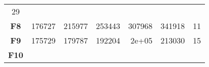 \documentclass[12pt,a4paper]{article}
\begin{document}
\begin{longtable}[c]{@{}crrrrrr@{}}
\begin{minipage}[t]{0.07\columnwidth}
29
\strut\end{minipage}\tabularnewline
\begin{minipage}[t]{0.11\columnwidth}\centering\strut
\textbf{F8}
\strut\end{minipage} &
\begin{minipage}[t]{0.08\columnwidth}\raggedleft\strut
176727
\strut\end{minipage} &
\begin{minipage}[t]{0.08\columnwidth}\raggedleft\strut
215977
\strut\end{minipage} &
\begin{minipage}[t]{0.09\columnwidth}\raggedleft\strut
253443
\strut\end{minipage} &
\begin{minipage}[t]{0.10\columnwidth}\raggedleft\strut
307968
\strut\end{minipage} &
\begin{minipage}[t]{0.11\columnwidth}\raggedleft\strut
341918
\strut\end{minipage} &
\begin{minipage}[t]{0.07\columnwidth}\raggedleft\strut
11
\strut\end{minipage}\tabularnewline
\begin{minipage}[t]{0.11\columnwidth}\centering\strut
\textbf{F9}
\strut\end{minipage} &
\begin{minipage}[t]{0.08\columnwidth}\raggedleft\strut
175729
\strut\end{minipage} &
\begin{minipage}[t]{0.08\columnwidth}\raggedleft\strut
179787
\strut\end{minipage} &
\begin{minipage}[t]{0.09\columnwidth}\raggedleft\strut
192204
\strut\end{minipage} &
\begin{minipage}[t]{0.10\columnwidth}\raggedleft\strut
2e+05
\strut\end{minipage} &
\begin{minipage}[t]{0.11\columnwidth}\raggedleft\strut
213030
\strut\end{minipage} &
\begin{minipage}[t]{0.07\columnwidth}\raggedleft\strut
15
\strut\end{minipage}\tabularnewline
\begin{minipage}[t]{0.11\columnwidth}\centering\strut
\textbf{F10}
\strut\end{minipage} &
\begin{minipage}[t]{0.08\columnwidth}\raggedleft\strut

\end{minipage}
\end{longtable}
\end{document}
